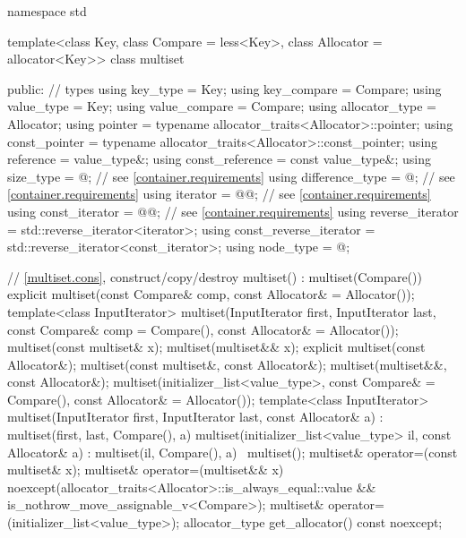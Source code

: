 \begin{codeblock}
namespace std {
  template<class Key, class Compare = less<Key>,
           class Allocator = allocator<Key>>
  class multiset {
  public:
    // types
    using key_type               = Key;
    using key_compare            = Compare;
    using value_type             = Key;
    using value_compare          = Compare;
    using allocator_type         = Allocator;
    using pointer                = typename allocator_traits<Allocator>::pointer;
    using const_pointer          = typename allocator_traits<Allocator>::const_pointer;
    using reference              = value_type&;
    using const_reference        = const value_type&;
    using size_type              = @\impdef@; // see \ref{container.requirements}
    using difference_type        = @\impdef@; // see \ref{container.requirements}
    using iterator               = @@; // see \ref{container.requirements}
    using const_iterator         = @@; // see \ref{container.requirements}
    using reverse_iterator       = std::reverse_iterator<iterator>;
    using const_reverse_iterator = std::reverse_iterator<const_iterator>;
    using node_type              = @\unspec@;

    // \ref{multiset.cons}, construct/copy/destroy
    multiset() : multiset(Compare()) { }
    explicit multiset(const Compare& comp, const Allocator& = Allocator());
    template<class InputIterator>
      multiset(InputIterator first, InputIterator last,
               const Compare& comp = Compare(), const Allocator& = Allocator());
    multiset(const multiset& x);
    multiset(multiset&& x);
    explicit multiset(const Allocator&);
    multiset(const multiset&, const Allocator&);
    multiset(multiset&&, const Allocator&);
    multiset(initializer_list<value_type>, const Compare& = Compare(),
             const Allocator& = Allocator());
    template<class InputIterator>
      multiset(InputIterator first, InputIterator last, const Allocator& a)
        : multiset(first, last, Compare(), a) { }
    multiset(initializer_list<value_type> il, const Allocator& a)
      : multiset(il, Compare(), a) { }
    ~multiset();
    multiset& operator=(const multiset& x);
    multiset& operator=(multiset&& x)
      noexcept(allocator_traits<Allocator>::is_always_equal::value &&
               is_nothrow_move_assignable_v<Compare>);
    multiset& operator=(initializer_list<value_type>);
    allocator_type get_allocator() const noexcept;

}}
\end{codeblock}
